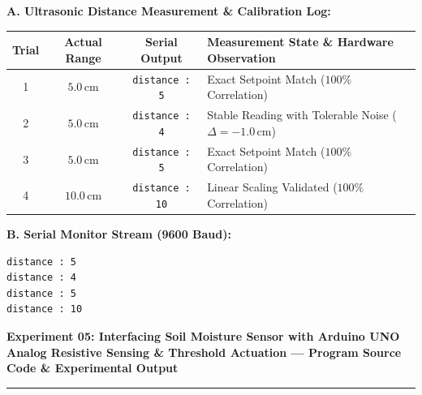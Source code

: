 \documentclass[10pt,a4paper]{article}
\begin{document}
\noindent
\textbf{A. Ultrasonic Distance Measurement \& Calibration Log:}\par\vspace{0.06cm}
{\footnotesize
\setlength{\tabcolsep}{6pt}
\renewcommand{\arraystretch}{1.18}
\begin{tabularx}{\textwidth}{|c|c|c|X|}
\hline
\textbf{Trial} & \textbf{Actual Range} & \textbf{Serial Output} & \textbf{Measurement State \& Hardware Observation} \\
\hline
1 & $5.0\,\text{cm}$ & \texttt{distance : 5} & Exact Setpoint Match ($100\%$ Correlation) \\
2 & $5.0\,\text{cm}$ & \texttt{distance : 4} & Stable Reading with Tolerable Noise ($\Delta = -1.0\,\text{cm}$) \\
3 & $5.0\,\text{cm}$ & \texttt{distance : 5} & Exact Setpoint Match ($100\%$ Correlation) \\
4 & $10.0\,\text{cm}$ & \texttt{distance : 10} & Linear Scaling Validated ($100\%$ Correlation) \\
\hline
\end{tabularx}
}

\vspace{0.22cm}

\noindent
\textbf{B. Serial Monitor Stream (9600 Baud):}\par\vspace{0.05cm}
\begin{lstlisting}[style=bwTerminal]
distance : 5
distance : 4
distance : 5
distance : 10
\end{lstlisting}

\newpage
\begin{center}
    {\large\bfseries Experiment 05: Interfacing Soil Moisture Sensor with Arduino UNO}\\[0.08cm]
    {\normalsize\textbf{Analog Resistive Sensing \& Threshold Actuation --- Program Source Code \& Experimental Output}}
\end{center}
\vspace{-0.20cm}
\rule{\textwidth}{0.9pt}
\vspace{0.06cm}
\end{document}
